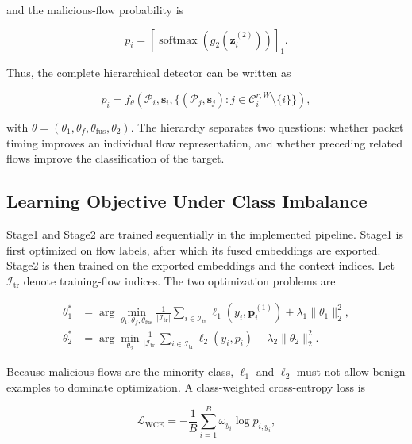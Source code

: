 and the malicious-flow probability is

\begin{equation}
p_i
=
\left[
\operatorname{softmax}
\left(g_{2}(\mathbf{z}_{i}^{(2)})\right)
\right]_{1}.
\label{eq:final_probability}
\end{equation}

Thus, the complete hierarchical detector can be written as

\begin{equation}
p_i
=
f_{\theta}
\left(
\mathcal{P}_i,
\mathbf{s}_i,
\{(\mathcal{P}_j,\mathbf{s}_j):j\in\mathcal{C}_{i}^{r,W}\setminus\{i\}\}
\right),
\label{eq:hierarchical_detector}
\end{equation}

with $\theta=(\theta_1,\theta_f,\theta_{\mathrm{fus}},\theta_2)$. The hierarchy
separates two questions: whether packet timing improves an individual flow
representation, and whether preceding related flows improve the classification
of the target.

\subsection{Learning Objective Under Class Imbalance}
\label{subsec:pf_objective}

Stage1 and Stage2 are trained sequentially in the implemented pipeline. Stage1
is first optimized on flow labels, after which its fused embeddings are
exported. Stage2 is then trained on the exported embeddings and the context
indices. Let $\mathcal{I}_{\mathrm{tr}}$ denote training-flow indices. The two
optimization problems are

\begin{align}
\theta_{1}^{*}
&=
\arg\min_{\theta_1,\theta_f,\theta_{\mathrm{fus}}}
\frac{1}{|\mathcal{I}_{\mathrm{tr}}|}
\sum_{i\in\mathcal{I}_{\mathrm{tr}}}
\ell_{1}
\left(y_i,\mathbf{p}_{i}^{(1)}\right)
+\lambda_1\|\theta_{1}\|_{2}^{2},
\label{eq:stage1_objective}\\
\theta_{2}^{*}
&=
\arg\min_{\theta_2}
\frac{1}{|\mathcal{I}_{\mathrm{tr}}|}
\sum_{i\in\mathcal{I}_{\mathrm{tr}}}
\ell_{2}(y_i,p_i)
+\lambda_2\|\theta_{2}\|_{2}^{2}.
\label{eq:stage2_objective}
\end{align}

Because malicious flows are the minority class, $\ell_1$ and $\ell_2$ must not
allow benign examples to dominate optimization. A class-weighted
cross-entropy loss is

\begin{equation}
\mathcal{L}_{\mathrm{WCE}}
=
-\frac{1}{B}
\sum_{i=1}^{B}
\omega_{y_i}\log p_{i,y_i},
\label{eq:weighted_cross_entropy}
\end{equation}


